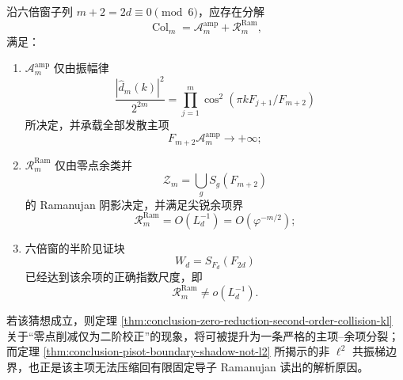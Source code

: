 \begin{conjecture}\label{conj:derived-window6-collision-amplitude-ramanujan-remainder-splitting}
沿六倍窗子列 \(m+2=2d\equiv 0\pmod 6\)，应存在分解
\[
\operatorname{Col}_m
=
\mathcal A_m^{\mathrm{amp}}
+\mathcal R_m^{\mathrm{Ram}},
\]
满足：
\begin{enumerate}
\normalfont
  \item \(\mathcal A_m^{\mathrm{amp}}\) 仅由振幅律
  \[
  \frac{|\widehat d_m(k)|^2}{2^{2m}}
  =
  \prod_{j=1}^{m}\cos^2\!\left(\pi kF_{j+1}/F_{m+2}\right)
  \]
  所决定，并承载全部发散主项
  \[
  F_{m+2}\mathcal A_m^{\mathrm{amp}}\to +\infty;
  \]
  \item \(\mathcal R_m^{\mathrm{Ram}}\) 仅由零点余类并
  \[
  \mathcal Z_m=\bigcup_{g}S_g(F_{m+2})
  \]
  的 Ramanujan 阴影决定，并满足尖锐余项界
  \[
  \mathcal R_m^{\mathrm{Ram}}=O(L_d^{-1})=O(\varphi^{-m/2});
  \]
  \item 六倍窗的半阶见证块
  \[
  W_d=S_{F_d}(F_{2d})
  \]
  已经达到该余项的正确指数尺度，即
  \[
  \mathcal R_m^{\mathrm{Ram}}\not=o(L_d^{-1}).
  \]
\end{enumerate}
若该猜想成立，则定理 \ref{thm:conclusion-zero-reduction-second-order-collision-kl} 关于“零点削减仅为二阶校正”的现象，将可被提升为一条严格的主项--余项分裂；而定理 \ref{thm:conclusion-pisot-boundary-shadow-not-l2} 所揭示的非 \(\ell^2\) 共振梯边界，也正是该主项无法压缩回有限固定导子 Ramanujan 读出的解析原因。
\end{conjecture}

\endinput
